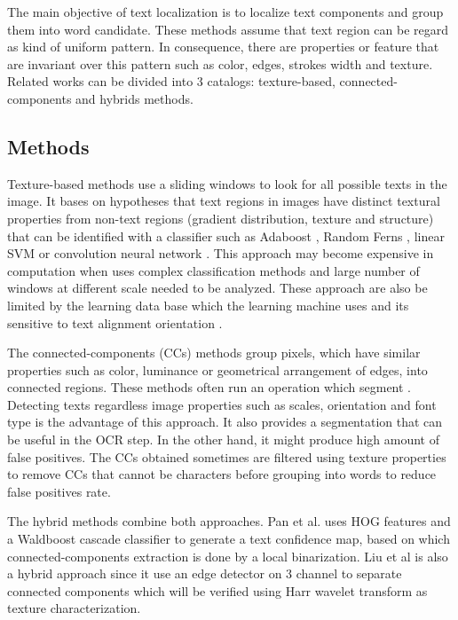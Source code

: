 The main objective of text localization is to localize text components and group them into word candidate. These methods assume that text region can be regard as kind of uniform pattern. In consequence, there are properties or feature that are invariant over this pattern such as color, edges, strokes width and texture. Related works can be divided into 3 catalogs: texture-based, connected-components and hybrids methods. 
\subsection{Methods}


Texture-based methods \cite{Chen.2004.CVPR} \cite{Lee.2011.ICDAR} \cite{wang.2011.iccv} \cite{Coates.2011.ICDAR} \cite{Wang.2012.ICPR} use a sliding windows to look for all possible texts in the image. It bases on hypotheses that text regions in images have distinct textural properties from non-text regions (gradient distribution, texture and structure) that can be identified with a classifier such as Adaboost \cite{Lee.2011.ICDAR}, Random Ferns \cite{wang.2011.iccv}, linear SVM \cite{Coates.2011.ICDAR} or convolution neural network \cite{Wang.2012.ICPR}. This approach may become expensive in computation when uses complex classification methods and large number of windows at different scale needed to be analyzed. These approach are also be limited by the learning data base which the learning machine uses and its sensitive to text alignment orientation \cite{Pan.2011.TIP}. 


The connected-components (CCs) methods \cite{Epshtein.2010.CVPR} \cite{xucheng.2013.pami} \cite{Neumann.2011.ICDAR} \cite{Lee.2010.ICPR} group pixels, which have similar properties such as color, luminance or geometrical arrangement of edges, into connected regions. These methods often run an operation which segment . Detecting texts regardless image properties such as scales, orientation and font type is the advantage of this approach. It also provides a segmentation that can be useful in the OCR step. In the other hand, it might produce high amount of false positives. The CCs obtained sometimes are filtered using texture properties to remove CCs that cannot be characters before grouping into words to reduce false positives rate.


The hybrid methods combine both approaches. Pan et al. \cite{Pan2009} uses HOG features and a Waldboost cascade classifier to generate a text confidence map, based on which connected-components extraction is done by a local binarization. Liu et al \cite{Liu.2006.CRA} is also a hybrid approach since it use an edge detector on 3 channel to separate connected components which will be verified using Harr wavelet transform as texture characterization.

